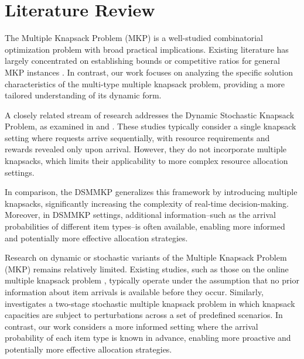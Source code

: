 \section{Literature Review}\label{literature}

The Multiple Knapsack Problem (MKP) \citep{martello1990knapsack} is a well-studied combinatorial optimization problem with broad practical implications. Existing literature has largely concentrated on establishing bounds or competitive ratios for general MKP instances \citet{khuri1994zero, ferreira1996solving, pisinger1999exact, chekuri2005polynomial}. In contrast, our work focuses on analyzing the specific solution characteristics of the multi-type multiple knapsack problem, providing a more tailored understanding of its dynamic form.

A closely related stream of research addresses the Dynamic Stochastic Knapsack Problem, as examined in \citet{kleywegt1998dynamic, kleywegt2001dynamic} and \citet{papastavrou1996dynamic}. These studies typically consider a single knapsack setting where requests arrive sequentially, with resource requirements and rewards revealed only upon arrival. However, they do not incorporate multiple knapsacks, which limits their applicability to more complex resource allocation settings.


In comparison, the DSMMKP generalizes this framework by introducing multiple knapsacks, significantly increasing the complexity of real-time decision-making. Moreover, in DSMMKP settings, additional information--such as the arrival probabilities of different item types--is often available, enabling more informed and potentially more effective allocation strategies. 

Research on dynamic or stochastic variants of the Multiple Knapsack Problem (MKP) remains relatively limited. Existing studies, such as those on the online multiple knapsack problem \citep{bienkowski2020optimal, sun2020competitive}, typically operate under the assumption that no prior information about item arrivals is available before they occur. Similarly, \citet{tonissen2017column} investigates a two-stage stochastic multiple knapsack problem in which knapsack capacities are subject to perturbations across a set of predefined scenarios. In contrast, our work considers a more informed setting where the arrival probability of each item type is known in advance, enabling more proactive and potentially more effective allocation strategies.





